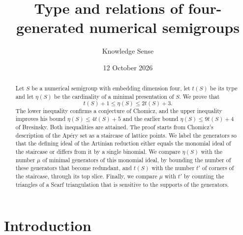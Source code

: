 \documentclass{amsart}
\theoremstyle{definition}
\theoremstyle{remark}
\numberwithin{equation}{section}
\begin{document}
\title{Type and relations of four-generated numerical semigroups}

\author{Knowledge Sense}
\address{Knowledge Sense}

\date{12 October 2026}



\begin{abstract}
Let $S$ be a numerical semigroup with embedding dimension four, let $t(S)$ be its type and let $\eta(S)$ be the cardinality of a minimal presentation of $S$. We prove that
\[
t(S)+1\le \eta(S)\le 2t(S)+3 .
\]
The lower inequality confirms a conjecture of Chomicz, and the upper inequality improves his bound $\eta(S)\le 4t(S)+5$ and the earlier bound $\eta(S)\le 9t(S)+4$ of Bresinsky. Both inequalities are attained. The proof starts from Chomicz's description of the Ap\'ery set as a staircase of lattice points. We label the generators so that the defining ideal of the Artinian reduction either equals the monomial ideal of the staircase or differs from it by a single binomial. We compare $\eta(S)$ with the number $\mu$ of minimal generators of this monomial ideal, by bounding the number of these generators that become redundant, and $t(S)$ with the number $t'$ of corners of the staircase, through its top slice. Finally, we compare $\mu$ with $t'$ by counting the triangles of a Scarf triangulation that is sensitive to the supports of the generators.
\end{abstract}

\maketitle

\section{Introduction}
\end{document}
